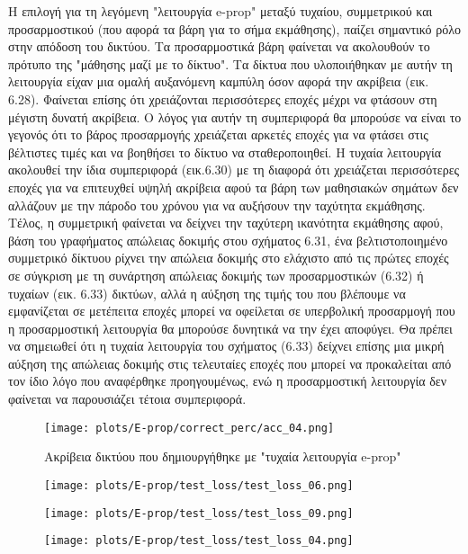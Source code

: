 \documentclass[12pt]{report}
\begin{document}
Η επιλογή για τη λεγόμενη "λειτουργία \textlatin{e-prop}" μεταξύ τυχαίου, συμμετρικού και προσαρμοστικού (που αφορά τα βάρη για το σήμα εκμάθησης), παίζει σημαντικό ρόλο στην απόδοση του δικτύου. Τα προσαρμοστικά βάρη φαίνεται να ακολουθούν το πρότυπο της "μάθησης μαζί με το δίκτυο". Τα δίκτυα που υλοποιήθηκαν με αυτήν τη λειτουργία είχαν μια ομαλή αυξανόμενη καμπύλη όσον αφορά την ακρίβεια (εικ. 6.28). Φαίνεται επίσης ότι χρειάζονται περισσότερες εποχές μέχρι να φτάσουν στη μέγιστη δυνατή ακρίβεια. Ο λόγος για αυτήν τη συμπεριφορά θα μπορούσε να είναι το γεγονός ότι το βάρος προσαρμογής χρειάζεται αρκετές εποχές για να φτάσει στις βέλτιστες τιμές και να βοηθήσει το δίκτυο να σταθεροποιηθεί. Η τυχαία λειτουργία ακολουθεί την ίδια συμπεριφορά (εικ.6.30) με τη διαφορά ότι χρειάζεται περισσότερες εποχές για να επιτευχθεί υψηλή ακρίβεια αφού τα βάρη των μαθησιακών σημάτων δεν αλλάζουν με την πάροδο του χρόνου για να αυξήσουν την ταχύτητα εκμάθησης. Τέλος, η συμμετρική φαίνεται να δείχνει την ταχύτερη ικανότητα εκμάθησης αφού, βάση του γραφήματος απώλειας δοκιμής στου σχήματος 6.31, ένα βελτιστοποιημένο συμμετρικό δίκτυου ρίχνει την απώλεια δοκιμής στο ελάχιστο από τις πρώτες εποχές σε σύγκριση με τη συνάρτηση απώλειας δοκιμής των προσαρμοστικών (6.32) ή τυχαίων (εικ. 6.33) δικτύων, αλλά η αύξηση της τιμής του που βλέπουμε να εμφανίζεται σε μετέπειτα εποχές μπορεί να οφείλεται σε υπερβολική προσαρμογή που η προσαρμοστική λειτουργία θα μπορούσε δυνητικά να την έχει αποφύγει. Θα πρέπει να σημειωθεί ότι η τυχαία λειτουργία του σχήματος (6.33) δείχνει επίσης μια μικρή αύξηση της απώλειας δοκιμής στις τελευταίες εποχές που μπορεί να προκαλείται από τον ίδιο λόγο που αναφέρθηκε προηγουμένως, ενώ η προσαρμοστική λειτουργία δεν φαίνεται να παρουσιάζει τέτοια συμπεριφορά.

\begin{figure}[htp] %
    \centering
     \texttt{[image: plots/E-prop/correct\_perc/acc\_04.png]}
    \caption{Ακρίβεια δικτύου που δημιουργήθηκε με "τυχαία λειτουργία \textlatin{e-prop}"}
    \label{fig:representation-methods}
\end{figure}

\begin{figure}
\centering
\begin{minipage}{.4\textwidth}
  \centering
  \texttt{[image: plots/E-prop/test\_loss/test\_loss\_06.png]}
  \label{fig:test1}
\end{minipage}
\begin{minipage}{.4\textwidth}
  \centering
  \texttt{[image: plots/E-prop/test\_loss/test\_loss\_09.png]}
  \label{fig:test2}
\end{minipage}
\begin{minipage}{.4\textwidth}
  \centering
  \texttt{[image: plots/E-prop/test\_loss/test\_loss\_04.png]}
  \label{fig:test1}
\end{minipage}
\end{figure}
\end{document}
